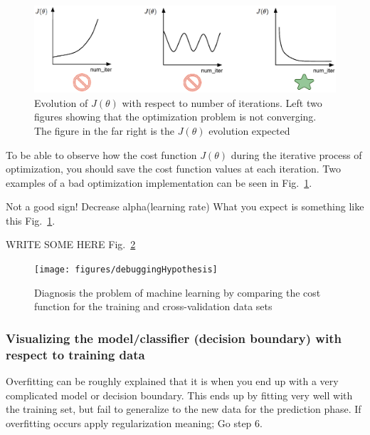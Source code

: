 \begin{figure}
\begin{center}
\includegraphics[width=15cm]{figures/visualizeCostFunc}    %
\caption{Evolution of $J(\theta)$ with respect to number of iterations. Left two figures showing that the optimization problem is not converging. The figure in the far right is the $J(\theta)$ evolution expected} 
\label{fig:visualizeCostFunc}
\end{center}
\end{figure}


To be able to observe how the cost function 
$J(\theta)$ during the iterative process of optimization, 
you should save the cost function values at each iteration.
Two examples of a bad optimization implementation can be seen in
Fig.~\ref{fig:visualizeCostFunc}. 

Not a good sign! Decrease alpha(learning rate)
What you expect is something like this Fig.~\ref{fig:visualizeCostFunc}. 


 WRITE SOME HERE Fig.~\ref{fig:debuggingHypothesis}
\begin{landscape}
\begin{figure}
\begin{center}
\texttt{[image: figures/debuggingHypothesis]}    %
\caption{Diagnosis the problem of machine learning by comparing the cost function for the training and cross-validation data sets} 
\label{fig:debuggingHypothesis}
\end{center}
\end{figure}
\end{landscape}

\subsubsection{Visualizing the model/classifier (decision boundary) with respect to training data}

Overfitting can be roughly explained that it is when you 
end up with a very complicated model or decision boundary. 
This ends up by fitting very well with the training set, but fail to 
generalize to the new data for the prediction phase. 
If overfitting occurs apply regularization meaning; Go step 6.

